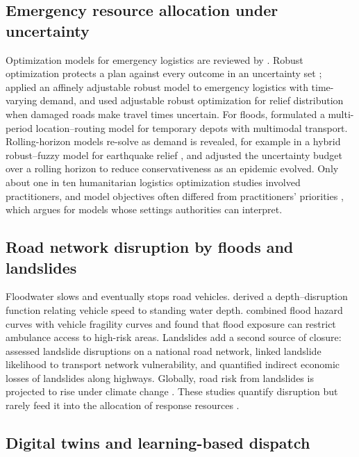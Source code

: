 \documentclass[pdflatex,sn-basic]{sn-jnl}
\theoremstyle{plain}%
\theoremstyle{remark}%
\theoremstyle{definition}%
\begin{document}
\subsection{Emergency resource allocation under uncertainty}

Optimization models for emergency logistics are reviewed by \citet{Caunhye2012}. Robust optimization protects a plan against every outcome in an uncertainty set \citep{BenTal2009,BertsimasSim2004}; \citet{BenTal2011} applied an affinely adjustable robust model to emergency logistics with time-varying demand, and \citet{Avishan2023} used adjustable robust optimization for relief distribution when damaged roads make travel times uncertain. For floods, \citet{Manopiniwes2021} formulated a multi-period location--routing model for temporary depots with multimodal transport. Rolling-horizon models re-solve as demand is revealed, for example in a hybrid robust--fuzzy model for earthquake relief \citep{Attar2026}, and \citet{Zhang2023} adjusted the uncertainty budget over a rolling horizon to reduce conservativeness as an epidemic evolved. Only about one in ten humanitarian logistics optimization studies involved practitioners, and model objectives often differed from practitioners' priorities \citep{RodriguezEspindola2023}, which argues for models whose settings authorities can interpret.

\subsection{Road network disruption by floods and landslides}

Floodwater slows and eventually stops road vehicles. \citet{Pregnolato2017} derived a depth--disruption function relating vehicle speed to standing water depth. \citet{He2026} combined flood hazard curves with vehicle fragility curves and found that flood exposure can restrict ambulance access to high-risk areas. Landslides add a second source of closure: \citet{Postance2017} assessed landslide disruptions on a national road network, \citet{Zhang2020} linked landslide likelihood to transport network vulnerability, and \citet{Zhang2021} quantified indirect economic losses of landslides along highways. Globally, road risk from landslides is projected to rise under climate change \citep{Duan2025}. These studies quantify disruption but rarely feed it into the allocation of response resources \citep{Vega2026}.

\subsection{Digital twins and learning-based dispatch}
\end{document}
